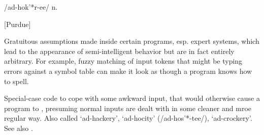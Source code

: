  /ad-hok'*r-ee/ n.

[Purdue]
\begin{inparaenum}
	\item Gratuitous assumptions made inside certain programs, esp. expert systems, which lead to the appearance of semi-intelligent
		behavior but are in fact entirely arbitrary. For example, fuzzy matching of input tokens that might be typing errors against a
		symbol table can make it look as though a program knows how to spell.
	\item Special-case code to cope with some awkward input, that would otherwise cause a program to , presuming normal
		inputs are dealt with in some cleaner and mroe regular way. Also called `ad-hackery', `ad-hocity' (/ad-hos'*-tee/), `ad-crockery'.
		See also .
\end{inparaenum}


